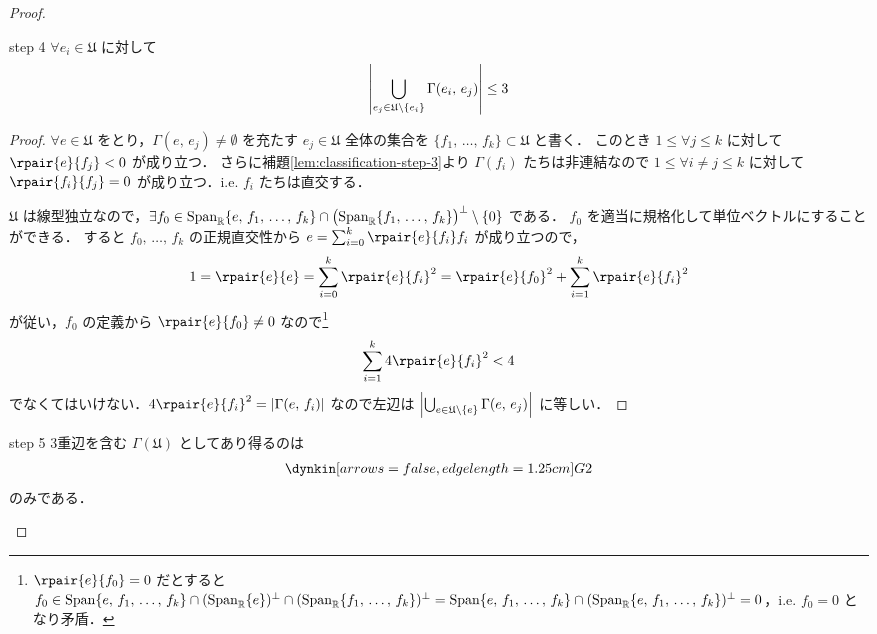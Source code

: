 \documentclass[rep_main]{subfiles}
\begin{document}
\begin{proof}
	\begin{mylem}[label=lem:classification-step-4]{step 4}
		$\forall e_i \in \mathfrak{U}$ に対して
		\begin{align}
			\abs{\bigcup_{e_j \in \mathfrak{U} \setminus \{e_i\}} \Gamma(e_i,\, e_j)} \le 3
		\end{align}
	\end{mylem}
	
	\begin{proof}
		$\forall e \in \mathfrak{U}$ をとり，$\Gamma(e,\, e_j) \neq \emptyset$ を充たす $e_j \in \mathfrak{U}$ 全体の集合を $\{f_1,\, \dots,\, f_k\} \subset \mathfrak{U}$ と書く．
		このとき $1 \le \forall j \le k$ に対して $\rpair{e}{f_j} < 0$ が成り立つ．
		さらに補題\ref{lem:classification-step-3}より $\Gamma(f_i)$ たちは非連結なので $1 \le \forall i \neq j \le k$ に対して $\rpair{f_i}{f_j} = 0$ が成り立つ．i.e. $f_i$ たちは直交する．

		$\mathfrak{U}$ は線型独立なので，$\exists f_0 \in \operatorname{Span}_{\mathbb{R}} \{e,\, f_1,\, \dots,\, f_k\} \cap \bigl(\operatorname{Span}_{\mathbb{R}} \{f_1,\, \dots,\, f_k\}\bigr)^\perp \setminus \{0\}$ である．
		$f_0$ を適当に規格化して単位ベクトルにすることができる． 
		すると $f_0,\, \dots,\, f_k$ の正規直交性から $e = \sum_{i=0}^k \rpair{e}{f_i} f_i$ が成り立つので，
		\begin{align}
			1 = \rpair{e}{e} = \sum_{i=0}^k \rpair{e}{f_i}^2 = \rpair{e}{f_0}^2 + \sum_{i=1}^k \rpair{e}{f_i}^2
		\end{align}
		が従い，$f_0$ の定義から $\rpair{e}{f_0} \neq 0$ なので\footnote{$\rpair{e}{f_0} = 0$ だとすると $f_0 \in \operatorname{Span}\{e,\, f_1,\, \dots,\, f_k\} \cap (\operatorname{Span}_{\mathbb{R}}\{e\})^\perp \cap (\operatorname{Span}_{\mathbb{R}}\{f_1,\, \dots,\, f_k\})^\perp = \operatorname{Span}\{e,\, f_1,\, \dots,\, f_k\} \cap (\operatorname{Span}_{\mathbb{R}}\{e,\, f_1,\, \dots,\, f_k\})^\perp = 0$，i.e. $f_0 = 0$ となり矛盾．}
		\begin{align}
			\sum_{i=1}^k 4\rpair{e}{f_i}^2 < 4
		\end{align}
		でなくてはいけない．$4\rpair{e}{f_i}^2 = \abs{\Gamma(e,\, f_i)}$ なので左辺は
		$\abs{\bigcup_{e \in \mathfrak{U} \setminus \{e\}} \Gamma(e,\, e_j)}$ に等しい．
	\end{proof}

	\begin{mylem}[label=lem:classification-step-5]{step 5}
		3重辺を含む $\Gamma(\mathfrak{U})$ としてあり得るのは
		\begin{align}
			\dynkin[arrows=false,edge length=1.25cm]G2
		\end{align}
		のみである．
	\end{mylem}
	

\end{proof}
\end{document}
